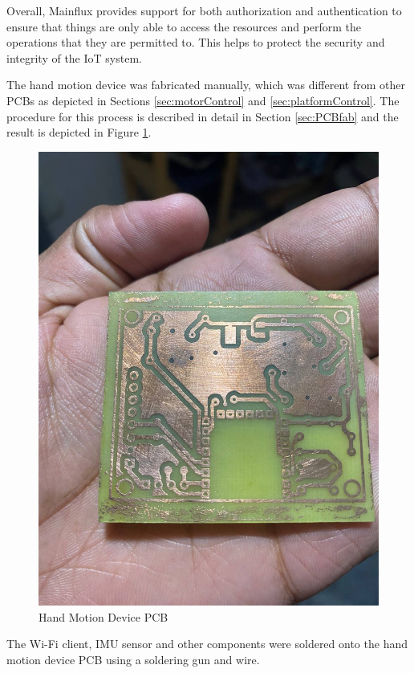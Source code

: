 Overall, Mainflux provides support for both authorization and authentication to ensure that things are only able to access the resources and perform the operations that they are permitted to. This helps to protect the security and integrity of the \ac{IoT} system.
\par
The hand motion device was fabricated manually, which was different from other \ac{PCB}s as depicted in Sections \ref{sec:motorControl} and \ref{sec:platformControl}. The procedure for this process is described in detail in Section \ref{sec:PCBfab} and the result is depicted in Figure \ref{fig:handMotionPCB}.

\begin{figure}[H]
    \centering
    \includegraphics[scale = 0.2]{Figures/handMotionPCB.jpg}
    \caption{Hand Motion Device \ac{PCB}}
    \label{fig:handMotionPCB}
\end{figure}

The Wi-Fi client, \ac{IMU} sensor and other components were soldered onto the hand motion device \ac{PCB} using a soldering gun and wire.

